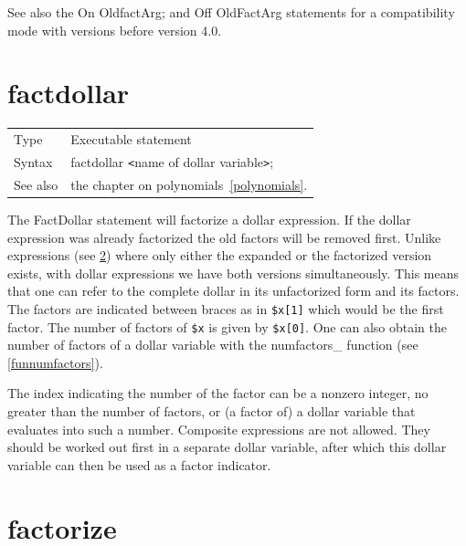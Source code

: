 See also the On OldfactArg; and Off OldFactArg statements for a 
compatibility mode with versions before version 4.0.
\vspace{10mm}


\section{factdollar}
\label{substafactdollar}

\noindent \begin{tabular}{ll}
Type & Executable statement\\
Syntax & factdollar {\tt<}name of dollar variable{\tt>};
\\ See also & the chapter on polynomials~\ref{polynomials}.
\end{tabular} \vspace{4mm}

\noindent The FactDollar statement will factorize a dollar expression. If 
the dollar expression was already factorized the old factors will be 
removed first. Unlike expressions (see \ref{substafactorize}) where only 
either the expanded or the factorized version exists, with dollar 
expressions we have both versions simultaneously. This means that one can 
refer to the complete dollar in its unfactorized form and its factors. The 
factors are indicated between braces as in \verb:$x[1]: which would be the 
first factor. The number of factors of \verb:$x: is given by \verb:$x[0]:. 
One can also obtain the number of factors of a dollar variable with the 
numfactors\_ function (see \ref{funnumfactors}).

\noindent The index indicating the number of the factor can be a nonzero 
integer, no greater than the number of factors, or (a factor of) a dollar 
variable that evaluates into such a number. Composite expressions are not 
allowed. They should be worked out first in a separate dollar variable, 
after which this dollar variable can then be used as a factor indicator.
\vspace{10mm}


\section{factorize}
\label{substafactorize}

